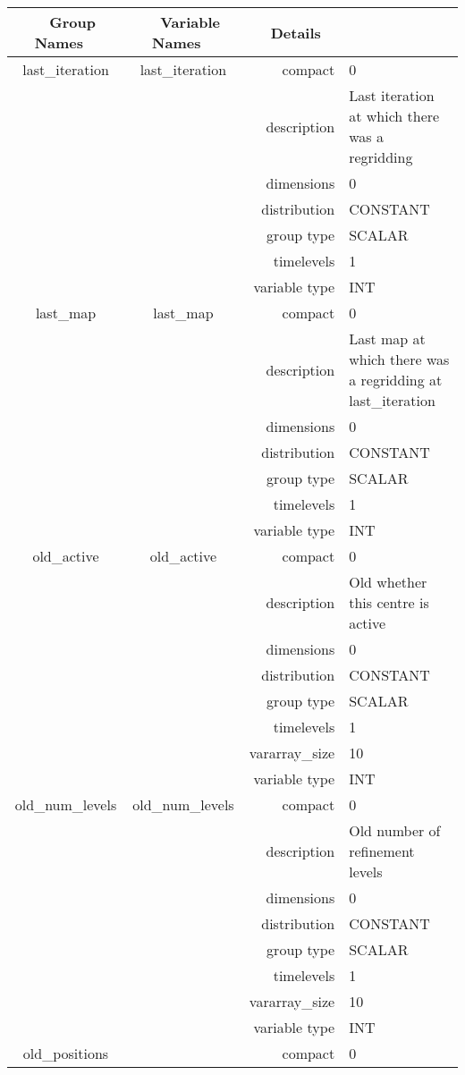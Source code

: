 \begin{tabular*}{150mm}{|c|c@{\extracolsep{\fill}}|rl|} \hline 
~ {\bf Group Names} ~ & ~ {\bf Variable Names} ~  &{\bf Details} ~ & ~\\ 
\hline 
last\_iteration & last\_iteration & compact & 0 \\ 
 &  & description & Last iteration at which there was a regridding \\ 
 &  & dimensions & 0 \\ 
 &  & distribution & CONSTANT \\ 
 &  & group type & SCALAR \\ 
 &  & timelevels & 1 \\ 
 &  & variable type & INT \\ 
\hline 
last\_map & last\_map & compact & 0 \\ 
 &  & description & Last map at which there was a regridding at last\_iteration \\ 
 &  & dimensions & 0 \\ 
 &  & distribution & CONSTANT \\ 
 &  & group type & SCALAR \\ 
 &  & timelevels & 1 \\ 
 &  & variable type & INT \\ 
\hline 
old\_active & old\_active & compact & 0 \\ 
 &  & description & Old whether this centre is active \\ 
 &  & dimensions & 0 \\ 
 &  & distribution & CONSTANT \\ 
 &  & group type & SCALAR \\ 
 &  & timelevels & 1 \\ 
 &  & vararray\_size & 10 \\ 
 &  & variable type & INT \\ 
\hline 
old\_num\_levels & old\_num\_levels & compact & 0 \\ 
 &  & description & Old number of refinement levels \\ 
 &  & dimensions & 0 \\ 
 &  & distribution & CONSTANT \\ 
 &  & group type & SCALAR \\ 
 &  & timelevels & 1 \\ 
 &  & vararray\_size & 10 \\ 
 &  & variable type & INT \\ 
\hline 
old\_positions &  & compact & 0 \\ 

\end{tabular*}
